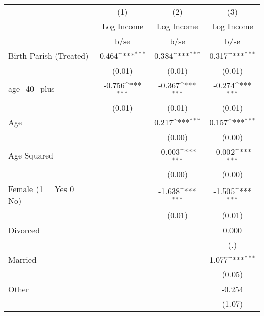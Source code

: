 {
\def\sym#1{\ifmmode^{#1}\else\(^{#1}\)\fi}
\begin{tabular}{l*{3}{c}}
\hline\hline
                    &\multicolumn{1}{c}{(1)}&\multicolumn{1}{c}{(2)}&\multicolumn{1}{c}{(3)}\\
                    &\multicolumn{1}{c}{Log Income}&\multicolumn{1}{c}{Log Income}&\multicolumn{1}{c}{Log Income}\\
                    &        b/se         &        b/se         &        b/se         \\
\hline
Birth Parish (Treated)&       0.464\sym{***}&       0.384\sym{***}&       0.317\sym{***}\\
                    &      (0.01)         &      (0.01)         &      (0.01)         \\
age\_40\_plus         &      -0.756\sym{***}&      -0.367\sym{***}&      -0.274\sym{***}\\
                    &      (0.01)         &      (0.01)         &      (0.01)         \\
Age                 &                     &       0.217\sym{***}&       0.157\sym{***}\\
                    &                     &      (0.00)         &      (0.00)         \\
Age Squared         &                     &      -0.003\sym{***}&      -0.002\sym{***}\\
                    &                     &      (0.00)         &      (0.00)         \\
Female (1 = Yes 0 = No)&                     &      -1.638\sym{***}&      -1.505\sym{***}\\
                    &                     &      (0.01)         &      (0.01)         \\
Divorced            &                     &                     &       0.000         \\
                    &                     &                     &         (.)         \\
Married             &                     &                     &       1.077\sym{***}\\
                    &                     &                     &      (0.05)         \\
Other               &                     &                     &      -0.254         \\
                    &                     &                     &      (1.07)         \\

\end{tabular}}
